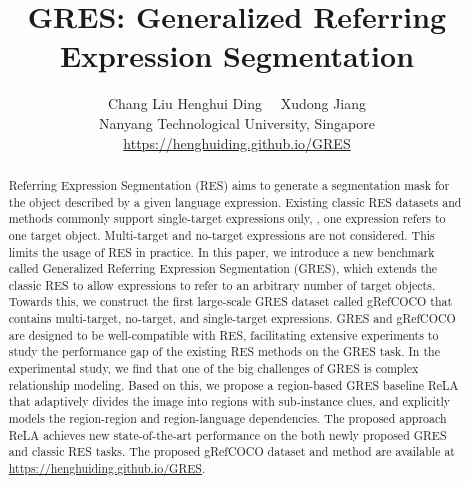 \documentclass[10pt,twocolumn,letterpaper]{article}
\begin{document}
\title{GRES: Generalized Referring Expression Segmentation}
\author{
Chang Liu\footnotemark[2]
\qquad
Henghui Ding\footnotemark[2]~~
\qquad
Xudong Jiang\\
Nanyang Technological University, Singapore\\
\href{https://henghuiding.github.io/GRES}{https://henghuiding.github.io/GRES}
}
\vspace{-5mm}


\renewcommand{\thefootnote}{\fnsymbol{footnote}}

\begin{abstract}
Referring Expression Segmentation (RES) aims to generate a segmentation mask for the object described by a given language expression. Existing classic RES datasets and methods commonly support single-target expressions only, \ie, one expression refers to one target object. Multi-target and no-target expressions are not considered. This limits the usage of RES in practice. In this paper, we introduce a new benchmark called Generalized Referring Expression Segmentation (GRES), which extends the classic RES to allow expressions to refer to an arbitrary number of target objects. Towards this, we construct the first large-scale GRES dataset called gRefCOCO that contains multi-target, no-target, and single-target expressions. GRES and gRefCOCO are designed to be well-compatible with RES, facilitating extensive experiments to study the performance gap of the existing RES methods on the GRES task. In the experimental study, we find that one of the big challenges of GRES is complex relationship modeling. Based on this, we propose a region-based GRES baseline ReLA that adaptively divides the image into regions with sub-instance clues, and explicitly models the region-region and region-language dependencies. The proposed approach ReLA achieves new state-of-the-art performance on the both newly proposed GRES and classic RES tasks. The proposed gRefCOCO dataset and method are available at \href{https://henghuiding.github.io/GRES}{https://henghuiding.github.io/GRES}.
  \vspace{-4mm}
\end{abstract}
\end{document}
